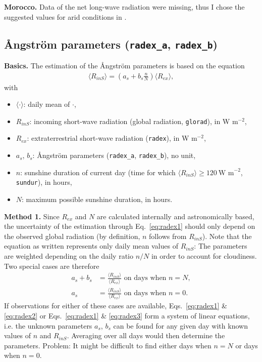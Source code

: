 \documentclass{scrreprt}
\newenvironment{denseitem}{
  \begin{itemize}
    \setlength{\itemsep}{0pt}
    \setlength{\parskip}{0pt}
    \setlength{\parsep}{0pt}
}{
  \end{itemize}
}
\begin{document}
\textbf{Morocco.}
Data of the net long-wave radiation were missing, thus I chose the suggested values for arid conditions in \citet{maidment93}.

\subsection{{\AA}ngstr\"om parameters (\texttt{radex\_a}, \texttt{radex\_b})} \label{ssec:parest_rad_radex}

\textbf{Basics.}
The estimation of the {\AA}ngstr\"om parameters is based on the equation
\begin{align} \label{eq:radex1}
  \langle R_{inS} \rangle = \left (  a_s + b_s \frac{n}{N} \right ) \langle R_{ex} \rangle,
\end{align}
%
with
\begin{denseitem}
  \item[] $\langle \cdot \rangle$: daily mean of $\cdot$,
  \item[] $R_{inS}$: incoming short-wave radiation (global radiation, \verb!glorad!), in W m$^{-2}$,
  \item[] $R_{ex}$: extraterrestrial short-wave radiation (\verb!radex!), in W m$^{-2}$,
  \item[] $a_s$, $b_s$: {\AA}ngstr\"om parameters (\verb!radex_a!, \verb!radex_b!), no unit,
  \item[] $n$: sunshine duration of current day (time for which $\langle R_{inS} \rangle \geq 120~\text{W~m}^{-2}$, \verb!sundur!), in hours,
  \item[] $N$: maximum possible sunshine duration, in hours.
\end{denseitem}

\textbf{Method 1.}
Since $R_{ex}$ and $N$ are calculated internally and astronomically based, the uncertainty of the estimation through Eq.~\eqref{eq:radex1} should only depend on the observed global radiation (by definition, $n$ follows from $R_{inS}$).
Note that the equation as written represents only daily mean values of $R_{inS}$:
The parameters are weighted depending on the daily ratio $n/N$ in order to account for cloudiness.
Two special cases are therefore
\begin{align}
  a_s + b_s &= \frac{\langle R_{inS} \rangle}{\langle R_{ex} \rangle} \text{ on days when } n=N, \label{eq:radex2} \\
  a_s &= \frac{\langle R_{inS} \rangle}{\langle R_{ex} \rangle} \text{ on days when } n=0. \label{eq:radex3}
\end{align}
%
If observations for either of these cases are available, Eqs.~\eqref{eq:radex1} \& \eqref{eq:radex2} or Eqs.~\eqref{eq:radex1} \& \eqref{eq:radex3} form a system of linear equations, i.e. the unknown parameters $a_s$, $b_s$ can be found for any given day with known values of $n$ and $R_{inS}$.
Averaging over all days would then determine the parameters.
Problem: It might be difficult to find either days when $n=N$ or days when $n=0$.
\end{document}
